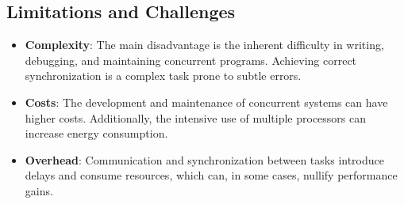 \subsection{Limitations and Challenges}
\begin{itemize}
    \item \textbf{Complexity}: The main disadvantage is the inherent difficulty in writing, debugging, and maintaining concurrent programs. Achieving correct synchronization is a complex task prone to subtle errors.
    \item \textbf{Costs}: The development and maintenance of concurrent systems can have higher costs. Additionally, the intensive use of multiple processors can increase energy consumption.
    \item \textbf{Overhead}: Communication and synchronization between tasks introduce delays and consume resources, which can, in some cases, nullify performance gains.
\end{itemize}